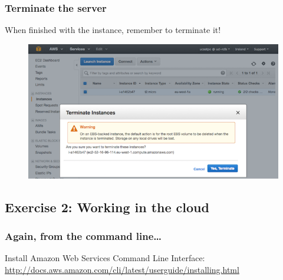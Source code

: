 \begin{Shaded}
\begin{Highlighting}[]
       \KeywordTok{__|}  \KeywordTok{__|_}  \NormalTok{)}
       \KeywordTok{_|} \DataTypeTok{\textbackslash{}(}     \KeywordTok{/}   
      \KeywordTok{___|}\DataTypeTok{\textbackslash{}\textbackslash{}}\KeywordTok{___|___|}

\NormalTok{[} \NormalTok{~]$}
\end{Highlighting}
\end{Shaded}

\subsubsection{Terminate the server}\label{terminate-the-server}

When finished with the instance, remember to terminate it!

\begin{figure}[htbp]
\centering
\includegraphics{10Cloud/figures/terminate_instance.png}
\end{figure}

\subsection{Exercise 2: Working in the
cloud}\label{exercise-2-working-in-the-cloud}

\subsubsection{Again, from the command
line\ldots{}}\label{again-from-the-command-line}

Install Amazon Web Services Command Line
Interface:\\\url{http://docs.aws.amazon.com/cli/latest/userguide/installing.html}

